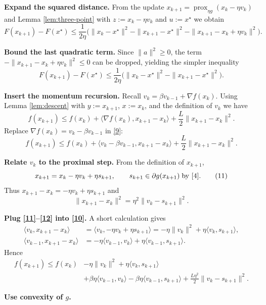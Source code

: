 \documentclass{article}
\newcommand{\prox}{\operatorname{prox}}
\newcommand{\grad}{\nabla}
\begin{document}
\begin{enumerate}[label={[\textbf{Step \arabic*}]}]
\item \textbf{Expand the squared distance.}  
From the update $x_{k+1}= \prox_{\eta g}(x_k-\eta v_k)$ and Lemma \ref{lem:three-point} with $z:=x_k-\eta v_k$ and $u:=x^\star$ we obtain
\[
F(x_{k+1})-F(x^\star)\le
\frac{1}{2\eta}\bigl(\|x_k-x^\star\|^{2}-\|x_{k+1}-x^\star\|^{2}
-\|x_{k+1}-x_k+\eta v_k\|^{2}\bigr).
\tag{7}
\]
\item \textbf{Bound the last quadratic term.}  
Since $\|a\|^{2}\ge0$, the term $-\|x_{k+1}-x_k+\eta v_k\|^{2}\le0$ can be dropped, yielding the simpler inequality
\[
F(x_{k+1})-F(x^\star)\le
\frac{1}{2\eta}\bigl(\|x_k-x^\star\|^{2}-\|x_{k+1}-x^\star\|^{2}\bigr).
\tag{8}
\]
\item \textbf{Insert the momentum recursion.}  
Recall $v_k=\beta v_{k-1}+ \grad f(x_k)$.  Using Lemma \ref{lem:descent} with $y:=x_{k+1}$, $x:=x_k$, and the definition of $v_k$ we have
\[
f(x_{k+1})\le f(x_k)+\langle\grad f(x_k),x_{k+1}-x_k\rangle+\frac{L}{2}\|x_{k+1}-x_k\|^{2}.
\tag{9}
\]
Replace $\grad f(x_k)=v_k-\beta v_{k-1}$ in \eqref{9}:
\[
f(x_{k+1})\le f(x_k)+\langle v_k-\beta v_{k-1},x_{k+1}-x_k\rangle+\frac{L}{2}\|x_{k+1}-x_k\|^{2}.
\tag{10}
\]
\item \textbf{Relate $v_k$ to the proximal step.}  
From the definition of $x_{k+1}$,
\[
x_{k+1}=x_k-\eta v_k + \eta s_{k+1},
\qquad s_{k+1}\in\partial g(x_{k+1})\;\text{by }\eqref{4}.
\tag{11}
\]
Thus $x_{k+1}-x_k = -\eta v_k + \eta s_{k+1}$ and
\[
\|x_{k+1}-x_k\|^{2}= \eta^{2}\|v_k-s_{k+1}\|^{2}.
\tag{12}
\]
\item \textbf{Plug \eqref{11}–\eqref{12} into \eqref{10}.}  
A short calculation gives
\[
\begin{aligned}
\langle v_k, x_{k+1}-x_k\rangle 
&= \langle v_k, -\eta v_k+\eta s_{k+1}\rangle
= -\eta\|v_k\|^{2}+ \eta\langle v_k,s_{k+1}\rangle,\\[2mm]
\langle v_{k-1}, x_{k+1}-x_k\rangle 
&= -\eta\langle v_{k-1},v_k\rangle+\eta\langle v_{k-1},s_{k+1}\rangle.
\end{aligned}
\tag{13}
\]
Hence
\[
\begin{aligned}
f(x_{k+1})\le f(x_k)&-\eta\|v_k\|^{2}
+\eta\langle v_k,s_{k+1}\rangle\\
&+\beta\eta\langle v_{k-1},v_k\rangle
-\beta\eta\langle v_{k-1},s_{k+1}\rangle
+\frac{L\eta^{2}}{2}\|v_k-s_{k+1}\|^{2}.
\end{aligned}
\tag{14}
\]
\item \textbf{Use convexity of $g$.}  

\end{enumerate}
\end{document}
